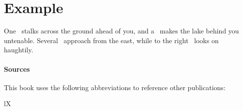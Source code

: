 \documentclass[letterpaper,twocolumn,openany,nodeprecatedcode]{dndbook}
\begin{document}
\mainmatter

\chapter{Example}

One \DndCitadelSpider\ stalks across the ground ahead of you, and a \DndSwarmOfSorrowfish\ makes the lake behind you untenable.  Several \DndBozakDraconian[s]\ approach from the east, while to the right \DndVerminaard*\ looks on haughtily.

\subsubsection{Sources}

This book uses the following abbreviations to reference other publications:


\newpage

\begin{DndTable}[header=Sources in a Table]{lX}
\end{DndTable}
\end{document}
